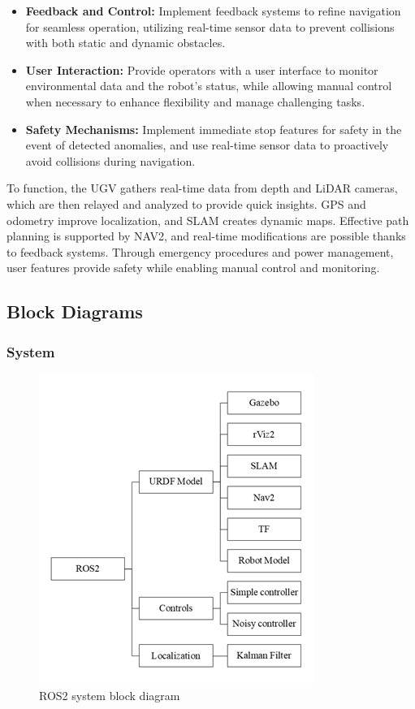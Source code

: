 {\begin{itemize}
		\item \textbf{Feedback and Control:}  Implement feedback systems to refine navigation for seamless
		operation, utilizing real-time sensor data to prevent collisions with both static and
		dynamic obstacles.
		
		\item \textbf{User Interaction:} Provide operators with a user interface to monitor environmental
		data and the robot's status, while allowing manual control when necessary to enhance
		flexibility and manage challenging tasks.
		
		\item \textbf{Safety Mechanisms:} Implement immediate stop features for safety in the event of
		detected anomalies, and use real-time sensor data to proactively avoid collisions during
		navigation.
	\end{itemize}
	
	To function, the UGV gathers real-time data from depth and LiDAR cameras, which are then
	relayed and analyzed to provide quick insights. GPS and odometry improve localization, and
	SLAM creates dynamic maps. Effective path planning is supported by NAV2, and real-time
	modifications are possible thanks to feedback systems. Through emergency procedures and
	power management, user features provide safety while enabling manual control and
	monitoring.
	

}

\subsection{Block Diagrams}

\subsubsection{System}
	\begin{figure}[H]
		\centering
		\includegraphics{images/Content/system_block_dia.png}
		\caption{ROS2 system block diagram}
		\label{fig:fig1}
	\end{figure}

